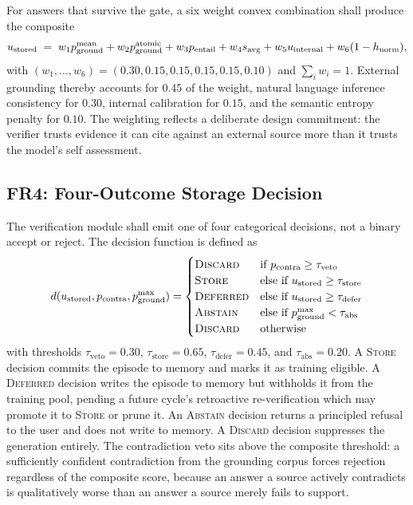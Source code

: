 For answers that survive the gate, a six weight convex combination shall produce the composite
\begin{equation}
u_{\text{stored}} \;=\;
w_1 p_{\text{ground}}^{\text{mean}} +
w_2 p_{\text{ground}}^{\text{atomic}} +
w_3 p_{\text{entail}} +
w_4 s_{\text{avg}} +
w_5 u_{\text{internal}} +
w_6 (1 - h_{\text{norm}}),
\label{eq:ustored}
\end{equation}
with $(w_1, \ldots, w_6) = (0.30, 0.15, 0.15, 0.15, 0.15, 0.10)$ and $\sum_i w_i = 1$. External grounding thereby accounts for $0.45$ of the weight, natural language inference consistency for $0.30$, internal calibration for $0.15$, and the semantic entropy penalty for $0.10$. The weighting reflects a deliberate design commitment: the verifier trusts evidence it can cite against an external source more than it trusts the model's self assessment.

\subsection{FR4: Four-Outcome Storage Decision}
\label{sec:fr4}

The verification module shall emit one of four categorical decisions, not a binary accept or reject. The decision function is defined as
\begin{equation}
d(u_{\text{stored}}, p_{\text{contra}}, p_{\text{ground}}^{\text{max}}) =
\begin{cases}
\textsc{Discard} & \text{if } p_{\text{contra}} \geq \tau_{\text{veto}} \\
\textsc{Store}    & \text{else if } u_{\text{stored}} \geq \tau_{\text{store}} \\
\textsc{Deferred} & \text{else if } u_{\text{stored}} \geq \tau_{\text{defer}} \\
\textsc{Abstain}  & \text{else if } p_{\text{ground}}^{\text{max}} < \tau_{\text{abs}} \\
\textsc{Discard}  & \text{otherwise}
\end{cases}
\label{eq:decide}
\end{equation}
with thresholds $\tau_{\text{veto}} = 0.30$, $\tau_{\text{store}} = 0.65$, $\tau_{\text{defer}} = 0.45$, and $\tau_{\text{abs}} = 0.20$. A \textsc{Store} decision commits the episode to memory and marks it as training eligible. A \textsc{Deferred} decision writes the episode to memory but withholds it from the training pool, pending a future cycle's retroactive re-verification which may promote it to \textsc{Store} or prune it. An \textsc{Abstain} decision returns a principled refusal to the user and does not write to memory. A \textsc{Discard} decision suppresses the generation entirely. The contradiction veto sits above the composite threshold: a sufficiently confident contradiction from the grounding corpus forces rejection regardless of the composite score, because an answer a source actively contradicts is qualitatively worse than an answer a source merely fails to support.

